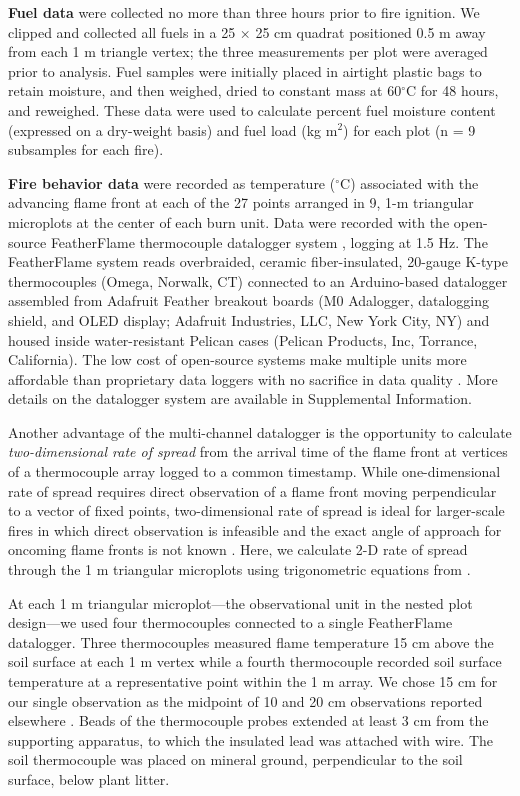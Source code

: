 \documentclass[referee, 
		     sn-basic]{sn-jnl}
\begin{document}
\begin{linenumbers}
\textbf{Fuel data} were collected no more than three hours prior to fire
ignition. We clipped and collected all fuels in a 25 × 25 cm quadrat
positioned 0.5 m away from each 1 m triangle vertex; the three
measurements per plot were averaged prior to analysis. Fuel samples were
initially placed in airtight plastic bags to retain moisture, and then
weighed, dried to constant mass at 60\(^\circ\)C for 48 hours, and
reweighed. These data were used to calculate percent fuel moisture
content (expressed on a dry-weight basis) and fuel load (kg m\(^{2}\))
for each plot (n = 9 subsamples for each fire).

\textbf{Fire behavior data} were recorded as temperature (\(^\circ\)C) associated with the advancing flame front at each of the 27 points arranged in 9, 1-m triangular microplots at the center of each burn unit. 
Data were recorded with the open-source FeatherFlame thermocouple datalogger system \citep{mcgranahan2021b}, logging at 1.5 Hz. The
FeatherFlame system reads overbraided, ceramic fiber-insulated, 20-gauge
K-type thermocouples (Omega, Norwalk, CT) connected to an Arduino-based
datalogger assembled from Adafruit Feather breakout boards (M0
Adalogger, datalogging shield, and OLED display; Adafruit Industries,
LLC, New York City, NY) and housed inside water-resistant Pelican cases
(Pelican Products, Inc, Torrance, California). 
The low cost of open-source systems make multiple units more affordable than proprietary data loggers with no sacrifice in data quality \citep{mcgranahan2021}.
More details on the datalogger system are available in Supplemental Information.

Another advantage of the multi-channel datalogger is the opportunity to calculate \emph{two-dimensional rate of spread} from the arrival time of the flame front at vertices of a thermocouple array logged to a common timestamp. 
While one-dimensional rate of spread requires direct observation of a flame front moving perpendicular to a vector of fixed points, two-dimensional rate of spread is ideal for larger-scale fires in which direct observation is infeasible and the exact angle of approach for oncoming flame fronts is not known \citep{finney2021}. 
Here, we calculate 2-D rate of spread through the 1 m triangular microplots using trigonometric equations from \citet{simard1984}.

At each 1 m triangular microplot---the observational unit in the nested plot design---we used four thermocouples connected to a single FeatherFlame datalogger. 
Three thermocouples measured flame temperature 15 cm above the soil surface at each 1 m vertex while a fourth thermocouple recorded soil surface temperature at a representative point within the 1 m array. 
We chose 15 cm for our single observation as the midpoint of 10 and 20 cm observations reported elsewhere \citep[e.g.,][]{archibold2003}.
Beads of the thermocouple probes extended at least 3 cm from the supporting apparatus, to which the insulated lead was attached with wire. 
The soil thermocouple was placed on mineral ground, perpendicular to the soil surface, below plant litter.


\end{linenumbers}
\end{document}
